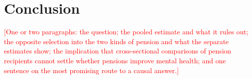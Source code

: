 \documentclass[11pt]{article}
\newcommand{\todo}[1]{\textcolor{red}{[#1]}}
\begin{document}
\section{Conclusion}

\todo{One or two paragraphs: the question; the pooled estimate and what it
rules out; the opposite selection into the two kinds of pension and what the
separate estimates show; the implication that cross-sectional comparisons of
pension recipients cannot settle whether pensions improve mental health; and
one sentence on the most promising route to a causal answer.}

\end{document}
